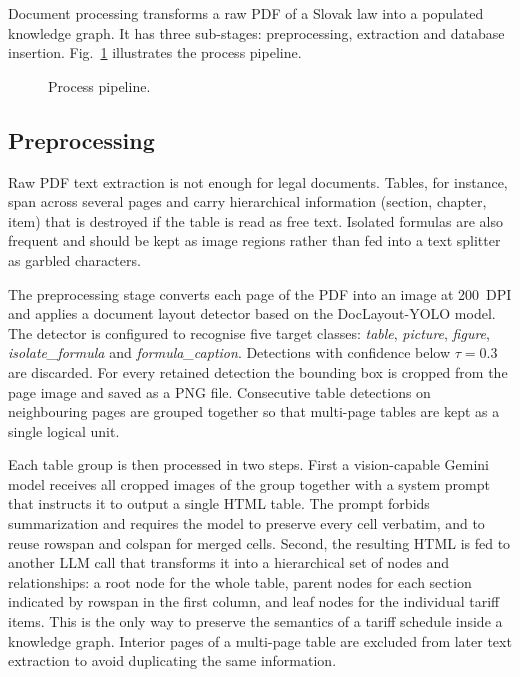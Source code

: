 \documentclass[conference]{IEEEtran}
\begin{document}
Document processing transforms a raw PDF of a Slovak law into a populated knowledge graph. It has three sub-stages: preprocessing, extraction and database insertion. Fig.~\ref{fig:process} illustrates the process pipeline.

\begin{figure}[h]
\centering
{}
\caption{Process pipeline.}
\label{fig:process}
\end{figure}

\subsection{Preprocessing}

Raw PDF text extraction is not enough for legal documents. Tables, for instance, span across several pages and carry hierarchical information (section, chapter, item) that is destroyed if the table is read as free text. Isolated formulas are also frequent and should be kept as image regions rather than fed into a text splitter as garbled characters.

The preprocessing stage converts each page of the PDF into an image at 200~DPI and applies a document layout detector based on the DocLayout-YOLO model. The detector is configured to recognise five target classes: \textit{table}, \textit{picture}, \textit{figure}, \textit{isolate\_formula} and \textit{formula\_caption}. Detections with confidence below $\tau=0.3$ are discarded. For every retained detection the bounding box is cropped from the page image and saved as a PNG file. Consecutive table detections on neighbouring pages are grouped together so that multi-page tables are kept as a single logical unit.

Each table group is then processed in two steps. First a vision-capable Gemini model receives all cropped images of the group together with a system prompt that instructs it to output a single HTML table. The prompt forbids summarization and requires the model to preserve every cell verbatim, and to reuse rowspan and colspan for merged cells. Second, the resulting HTML is fed to another LLM call that transforms it into a hierarchical set of nodes and relationships: a root node for the whole table, parent nodes for each section indicated by rowspan in the first column, and leaf nodes for the individual tariff items. This is the only way to preserve the semantics of a tariff schedule inside a knowledge graph. Interior pages of a multi-page table are excluded from later text extraction to avoid duplicating the same information.
\end{document}
